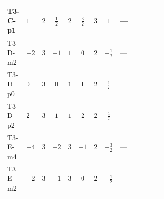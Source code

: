\documentclass[8pt]{article}
\begin{document}
\begin{landscape}
\begin{longtable}{@{}llcccccc >{\raggedright\arraybackslash}p{0.21\linewidth} >{\raggedright\arraybackslash}p{0.21\linewidth} >{\raggedright\arraybackslash}p{0.21\linewidth}@{}}
\midrule
T3-C-p1 & $1$ & $2$ & $\frac{1}{2}$ & $2$ & $\frac{3}{2}$ & $3$ & $1$ & --- & \scriptsize\adjustbox{max width=\linewidth}{$\begin{gathered} +4 {\lambda_{12}^{(1)}}^2\end{gathered}$} & \scriptsize\adjustbox{max width=\linewidth}{$\begin{gathered} +4 {\lambda_{HS_1}^{(1)}}^2\end{gathered}$} \\
\midrule
T3-D-m2 & $-2$ & $3$ & $-1$ & $1$ & $0$ & $2$ & $-\frac{1}{2}$ & --- & \scriptsize\adjustbox{max width=\linewidth}{$\begin{gathered} +2 {\lambda_{12}^{(1)}}^2\end{gathered}$} & \scriptsize\adjustbox{max width=\linewidth}{$\begin{gathered} +4 {\lambda_{HS_1}^{(1)}}^2\end{gathered}$} \\
\midrule
T3-D-p0 & $0$ & $3$ & $0$ & $1$ & $1$ & $2$ & $\frac{1}{2}$ & --- & \scriptsize\adjustbox{max width=\linewidth}{$\begin{gathered} +2 {\lambda_{12}^{(1)}}^2\end{gathered}$} & \scriptsize\adjustbox{max width=\linewidth}{$\begin{gathered} +4 {\lambda_{HS_1}^{(1)}}^2\end{gathered}$} \\
\midrule
T3-D-p2 & $2$ & $3$ & $1$ & $1$ & $2$ & $2$ & $\frac{3}{2}$ & --- & \scriptsize\adjustbox{max width=\linewidth}{$\begin{gathered} +2 {\lambda_{12}^{(1)}}^2\end{gathered}$} & \scriptsize\adjustbox{max width=\linewidth}{$\begin{gathered} +4 {\lambda_{HS_1}^{(1)}}^2\end{gathered}$} \\
\midrule
T3-E-m4 & $-4$ & $3$ & $-2$ & $3$ & $-1$ & $2$ & $-\frac{3}{2}$ & --- & \scriptsize\adjustbox{max width=\linewidth}{$\begin{gathered} +6 {\lambda_{12}^{(1)}}^2\end{gathered}$} & \scriptsize\adjustbox{max width=\linewidth}{$\begin{gathered} +4 {\lambda_{HS_1}^{(1)}}^2\end{gathered}$} \\
\midrule
T3-E-m2 & $-2$ & $3$ & $-1$ & $3$ & $0$ & $2$ & $-\frac{1}{2}$ & --- & \scriptsize\adjustbox{max width=\linewidth}{$\begin{gathered} +6 {\lambda_{12}^{(1)}}^2\end{gathered}$} & \scriptsize\adjustbox{max width=\linewidth}{$\begin{gathered} +4 {\lambda_{HS_1}^{(1)}}^2\end{gathered}$} \\

\end{longtable}
\end{landscape}
\end{document}
